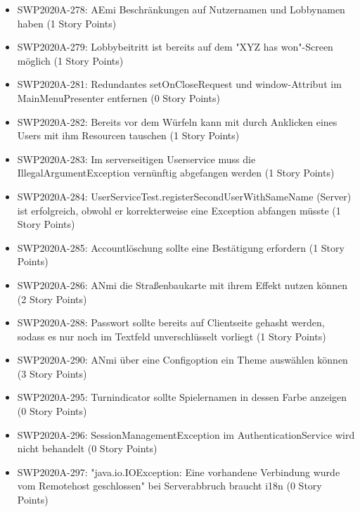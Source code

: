 \documentclass[12pt,a4paper, oneside]{article}
\begin{document}
\begin{itemize}
        \item SWP2020A-278:	AEmi Beschränkungen auf Nutzernamen und Lobbynamen haben (1 Story Points)

        \item SWP2020A-279:	Lobbybeitritt ist bereits auf dem "XYZ has won"-Screen möglich (1 Story Points)

        \item SWP2020A-281:	Redundantes setOnCloseRequest und window-Attribut im MainMenuPresenter entfernen (0 Story Points)

        \item SWP2020A-282:	Bereits vor dem Würfeln kann mit durch Anklicken eines Users mit ihm Resourcen tauschen (1 Story Points)

        \item SWP2020A-283:	Im serverseitigen Userservice muss die IllegalArgumentException vernünftig abgefangen werden (1 Story Points)

        \item SWP2020A-284:	UserServiceTest.registerSecondUserWithSameName (Server) ist erfolgreich, obwohl er korrekterweise eine Exception abfangen müsste (1 Story Points)

        \item SWP2020A-285:	Accountlöschung sollte eine Bestätigung erfordern (1 Story Points)

        \item SWP2020A-286:	ANmi die Straßenbaukarte mit ihrem Effekt nutzen können (2 Story Points)

        \item SWP2020A-288:	Passwort sollte bereits auf Clientseite gehasht werden, sodass es nur noch im Textfeld unverschlüsselt vorliegt (1 Story Points)

        \item SWP2020A-290:	ANmi über eine Configoption ein Theme auswählen können (3 Story Points)

        \item SWP2020A-295:	Turnindicator sollte Spielernamen in dessen Farbe anzeigen (0 Story Points)

        \item SWP2020A-296:	SessionManagementException im AuthenticationService wird nicht behandelt (0 Story Points)

        \item SWP2020A-297:	"java.io.IOException: Eine vorhandene Verbindung wurde vom Remotehost geschlossen" bei Serverabbruch braucht i18n (0 Story Points)


\end{itemize}
\end{document}
